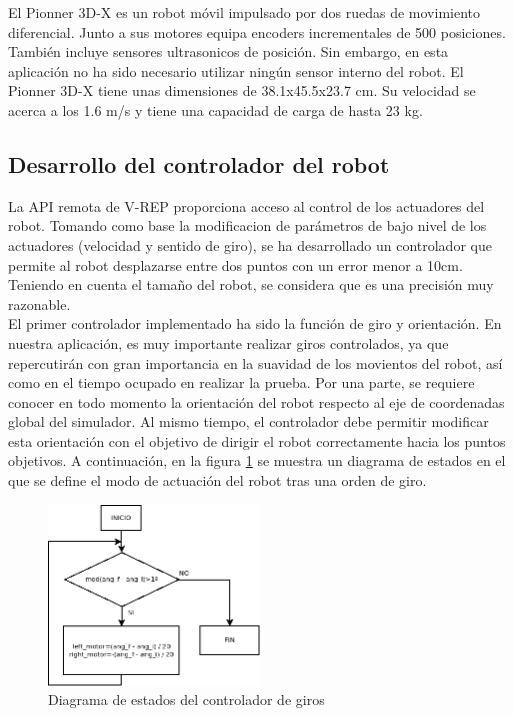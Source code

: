 El Pionner 3D-X es un robot móvil impulsado por dos ruedas de movimiento diferencial. Junto a sus motores equipa encoders incrementales de 500 posiciones. También incluye sensores ultrasonicos de posición. Sin embargo, en esta aplicación no ha sido necesario utilizar ningún sensor interno del robot. El Pionner 3D-X tiene unas dimensiones de 38.1x45.5x23.7 cm. Su velocidad se acerca a los 1.6 m/s y tiene una capacidad de carga de hasta 23 kg.

\subsection{Desarrollo del controlador del robot}

La API remota de V-REP proporciona acceso al control de los actuadores del robot. Tomando como base la modificacion de parámetros de bajo nivel de los actuadores (velocidad y sentido de giro), se ha desarrollado un controlador que permite al robot desplazarse entre dos puntos con un error menor a 10cm. Teniendo en cuenta el tamaño del robot, se considera que es una precisión muy razonable.\\

El primer controlador implementado ha sido la función de giro y orientación. En nuestra aplicación, es muy importante realizar giros controlados, ya que repercutirán con gran importancia en la suavidad de los movientos del robot, así como en el tiempo ocupado en realizar la prueba. Por una parte, se requiere conocer en todo momento la orientación del robot respecto al eje de coordenadas global del simulador. Al mismo tiempo, el controlador debe permitir modificar esta orientación con el objetivo de dirigir el robot correctamente hacia los puntos objetivos. A continuación, en la figura \ref{fig:flujogiro} se muestra un diagrama de estados en el que se define el modo de actuación del robot tras una orden de giro.\\

\begin{figure}[H]
		\centering
        \includegraphics[width=0.5\textwidth]{images/flujogiro.png}
        \caption{Diagrama de estados del controlador de giros}
        \label{fig:flujogiro}
\end{figure} 


